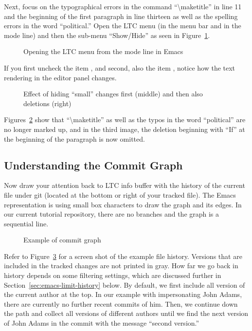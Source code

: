 Next, focus on the typographical errors in the command ``\textbackslash maketitle'' in line 11 and the beginning of the first paragraph in line thirteen as well as the spelling errors in the word ``political.''  Open the LTC menu (in the menu bar and in the mode line) and then the sub-menu ``Show/Hide'' as seen in Figure~\ref{fig:emacs-LTC-menu}.  
\begin{figure}[t]
\centering
{}
\caption{Opening the LTC menu from the mode line in Emacs} \label{fig:emacs-LTC-menu}
\end{figure}
If you first uncheck the item , and second, also the item , notice how the text rendering in the editor panel changes.
\begin{figure}[t]
  \centering
  \hspace{2em}
  \hspace{2em}
\caption[Effect of hiding ``small'' changes and deletions]{Effect of hiding ``small'' changes first (middle) and then also deletions (right)} \label{fig:emacs-filter-small}
\end{figure}
Figures~\ref{fig:emacs-filter-small} show that ``\textbackslash maketitle'' as well as the typos in the word ``political'' are no longer marked up, and in the third image, the deletion beginning with ``If'' at the beginning of the paragraph is now omitted.

\subsection{Understanding the Commit Graph}

Now draw your attention back to LTC info buffer with the history of the current file under git (located at the bottom or right of your tracked file).  The Emacs representation is using small box characters to draw the graph and its edges.  In our current tutorial repository, there are no branches and the graph is a sequential line.  
\begin{figure}[t]
\centering
{}
\caption{Example of commit graph} \label{fig:emacs-commit-graph}
\end{figure}
Refer to Figure~\ref{fig:emacs-commit-graph} for a screen shot of the example file history. Versions that are included in the tracked changes are not printed in gray.  How far we go back in history depends on some filtering settings, which are discussed further in Section~\ref{sec:emacs-limit-history} below.  By default, we first include all version of the current author at the top.  In our example with impersonating John Adams, there are currently no further recent commits of him.  Then, we continue down the path and collect all versions of different authors until we find the next version of John Adams in the commit with the message ``second version.''

